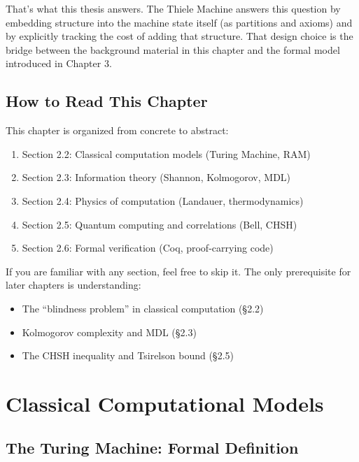That's what this thesis answers.
The Thiele Machine answers this question by embedding structure into the machine state itself (as partitions and axioms) and by explicitly tracking the cost of adding that structure. That design choice is the bridge between the background material in this chapter and the formal model introduced in Chapter 3.

\subsection{How to Read This Chapter}

This chapter is organized from concrete to abstract:
\begin{enumerate}
    \item Section 2.2: Classical computation models (Turing Machine, RAM)
    \item Section 2.3: Information theory (Shannon, Kolmogorov, MDL)
    \item Section 2.4: Physics of computation (Landauer, thermodynamics)
    \item Section 2.5: Quantum computing and correlations (Bell, CHSH)
    \item Section 2.6: Formal verification (Coq, proof-carrying code)
\end{enumerate}

If you are familiar with any section, feel free to skip it. The only prerequisite for later chapters is understanding:
\begin{itemize}
    \item The ``blindness problem'' in classical computation (\S2.2)
    \item Kolmogorov complexity and MDL (\S2.3)
    \item The CHSH inequality and Tsirelson bound (\S2.5)
\end{itemize}

\section{Classical Computational Models}

\subsection{The Turing Machine: Formal Definition}

